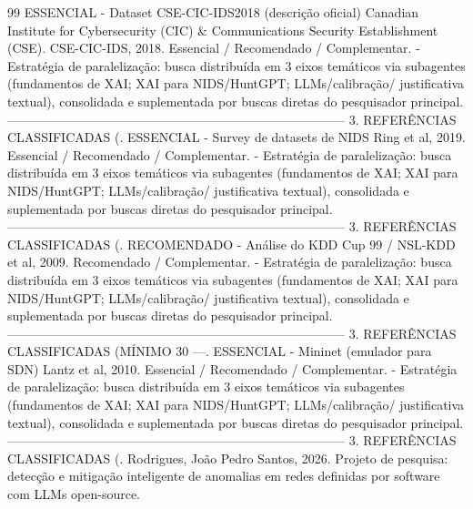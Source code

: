 \documentclass[12pt,a4paper]{article}
\begin{document}
\begin{thebibliography}{99}
 ESSENCIAL - Dataset CSE-CIC-IDS2018 (descrição oficial) Canadian Institute for Cybersecurity (CIC) \& Communications Security Establishment (CSE). CSE-CIC-IDS, 2018. Essencial / Recomendado / Complementar. - Estratégia de paralelização: busca distribuída em 3 eixos temáticos via subagentes (fundamentos de XAI; XAI para NIDS/HuntGPT; LLMs/calibração/ justificativa textual), consolidada e suplementada por buscas diretas do pesquisador principal. -------------------------------------------------------------------------------- 3. REFERÊNCIAS CLASSIFICADAS (.
 ESSENCIAL - Survey de datasets de NIDS Ring et al, 2019. Essencial / Recomendado / Complementar. - Estratégia de paralelização: busca distribuída em 3 eixos temáticos via subagentes (fundamentos de XAI; XAI para NIDS/HuntGPT; LLMs/calibração/ justificativa textual), consolidada e suplementada por buscas diretas do pesquisador principal. -------------------------------------------------------------------------------- 3. REFERÊNCIAS CLASSIFICADAS (.
 RECOMENDADO - Análise do KDD Cup 99 / NSL-KDD et al, 2009. Recomendado / Complementar. - Estratégia de paralelização: busca distribuída em 3 eixos temáticos via subagentes (fundamentos de XAI; XAI para NIDS/HuntGPT; LLMs/calibração/ justificativa textual), consolidada e suplementada por buscas diretas do pesquisador principal. -------------------------------------------------------------------------------- 3. REFERÊNCIAS CLASSIFICADAS (MÍNIMO 30 —.
 ESSENCIAL - Mininet (emulador para SDN) Lantz et al, 2010. Essencial / Recomendado / Complementar. - Estratégia de paralelização: busca distribuída em 3 eixos temáticos via subagentes (fundamentos de XAI; XAI para NIDS/HuntGPT; LLMs/calibração/ justificativa textual), consolidada e suplementada por buscas diretas do pesquisador principal. -------------------------------------------------------------------------------- 3. REFERÊNCIAS CLASSIFICADAS (.
 Rodrigues, João Pedro Santos, 2026. Projeto de pesquisa: detecção e mitigação inteligente de anomalias em redes definidas por software com LLMs open-source.
\end{thebibliography}
\end{document}
